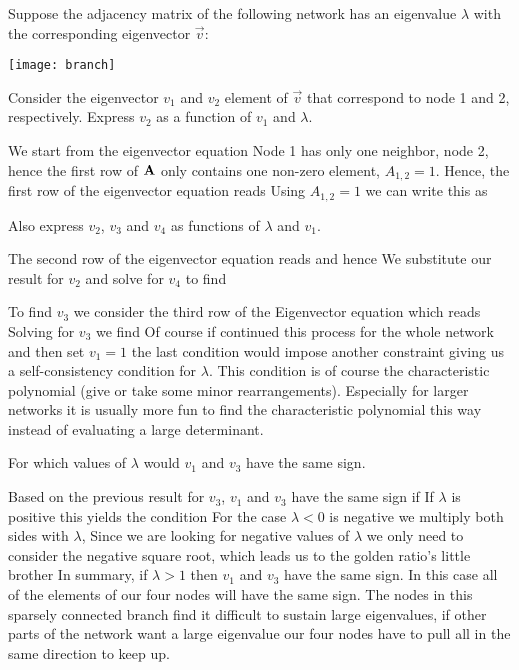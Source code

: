 
Suppose the adjacency matrix of the following network has an eigenvalue $\lambda$ with the corresponding eigenvector $\vec{v}$:
\begin{center}
\texttt{[image: branch]}
\end{center}

\subquestion 
Consider the eigenvector $v_1$ and $v_2$ element of $\vec{v}$ that correspond to node 1 and 2, respectively. Express $v_2$ as a function of $v_1$ and $\lambda$. 

\solution 
We start from the eigenvector equation 
Node 1 has only one neighbor, node 2, hence the first row of $\bf A$ only contains one non-zero element, $A_{1,2}=1$. Hence, the first row of the eigenvector equation reads
Using $A_{1,2}=1$ we can write this as 

\subquestion 
Also express $v_2$, $v_3$ and $v_4$ as functions of $\lambda$ and $v_1$. 

\solution
The second row of the eigenvector equation reads 
and hence 
We substitute our result for $v_2$ and solve for $v_4$ to find

To find $v_3$ we consider the third row of the Eigenvector equation which reads
Solving for $v_3$ we find
Of course if continued this process for the whole network and then set $v_1=1$ the last condition would impose another constraint giving us a self-consistency condition for $\lambda$. This condition is of course the characteristic polynomial (give or take some minor rearrangements). Especially for larger networks it is usually more fun to find the characteristic polynomial this way instead of evaluating a large determinant.   

\subquestion For which values of $\lambda$ would $v_1$ and $v_3$ have the same sign. 

\solution 
Based on the previous result for $v_3$, $v_1$ and $v_3$ have the same sign if 
If $\lambda$ is positive this yields the condition
For the case $\lambda<0$ is negative we multiply both sides with $\lambda$, 
Since we are looking for negative values of $\lambda$ we only need to consider the negative square root, which leads us to the golden ratio's little brother
In summary, if $\lambda>1$ then $v_1$ and $v_3$ have the same sign. In this case all of the elements of our four nodes will have the same sign. The nodes in this sparsely connected branch find it difficult to sustain large eigenvalues, if other parts of the network want a large eigenvalue our four nodes have to pull all in the same direction to keep up.  

